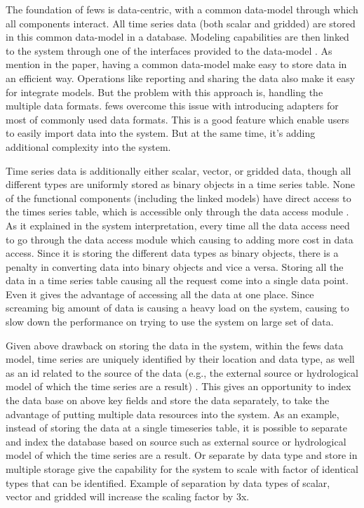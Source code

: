 The foundation of \acrshort{fews} is data-centric, with a common data-model through which all components interact. All time series data (both scalar and gridded) are stored in this common data-model in a database. Modeling capabilities are then linked to the system through one of the interfaces provided to the data-model \cite{Werner2013TheSystem}. As mention in the paper, having a common data-model make easy to store data in an efficient way. Operations like reporting and sharing the data also make it easy for integrate models. But the problem with this approach is, handling the multiple data formats. \acrshort{fews} overcome this issue with introducing adapters for most of commonly used data formats. This is a good feature which enable users to easily import data into the system. But at the same time, it's adding additional complexity into the system.

Time series data is additionally either scalar, vector, or gridded data, though all different types are uniformly stored as binary objects in a time series table. None of the functional components (including the linked models) have direct access to the times series table, which is accessible only through the data access module \cite{Werner2013TheSystem}. As it explained in the system interpretation, every time all the data access need to go through the data access module which causing to adding more cost in data access. Since it is storing the different data types as binary objects, there is a penalty in converting data into binary objects and vice a versa. Storing all the data in a time series table causing all the request come into a single data point. Even it gives the advantage of accessing all the data at one place. Since screaming big amount of data is causing a heavy load on the system, causing to slow down the performance on trying to use the system on large set of data.

Given above drawback on storing the data in the system, within the \acrshort{fews} data model, time series are uniquely identified by their location and data type, as well as an id related to the source of the data (e.g., the external source or hydrological model of which the time series are a result) \cite{Werner2013TheSystem}. This gives an opportunity to index the data base on above key fields and store the data separately, to take the advantage of putting multiple data resources into the system. As an example, instead of storing the data at a single timeseries table, it is possible to separate and index the database based on source such as external source or hydrological model of which the time series are a result. Or separate by data type and store in multiple storage give the capability for the system to scale with factor of identical types that can be identified. Example of separation by data types of scalar, vector and gridded will increase the scaling factor by 3x.

